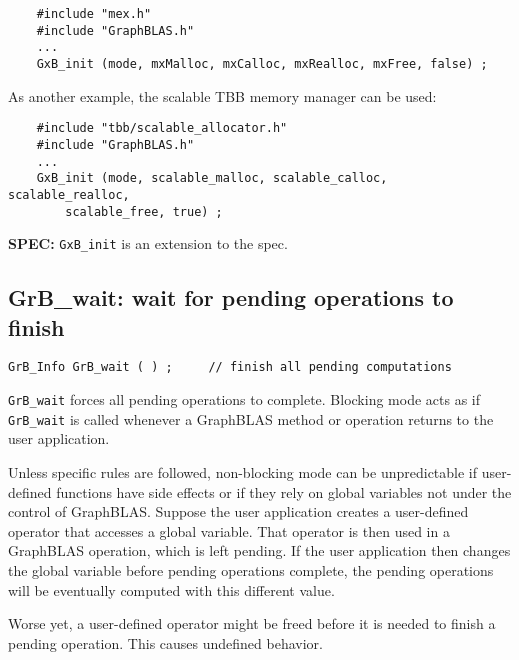 \documentclass[12pt]{article}
\begin{document}
    {\footnotesize
    \begin{verbatim}
    #include "mex.h"
    #include "GraphBLAS.h"
    ...
    GxB_init (mode, mxMalloc, mxCalloc, mxRealloc, mxFree, false) ; \end{verbatim}}

As another example, the scalable TBB memory manager can be used:

    {\footnotesize
    \begin{verbatim}
    #include "tbb/scalable_allocator.h"
    #include "GraphBLAS.h"
    ...
    GxB_init (mode, scalable_malloc, scalable_calloc, scalable_realloc,
        scalable_free, true) ; \end{verbatim}}

\begin{spec}
{\bf SPEC:} \verb'GxB_init' is an extension to the spec.
\end{spec}

\newpage
\subsection{{\sf GrB\_wait:} wait for pending operations to finish} %
\label{wait}

\begin{mdframed}[userdefinedwidth=6in]
{\footnotesize
\begin{verbatim}
GrB_Info GrB_wait ( ) ;     // finish all pending computations
\end{verbatim}
}\end{mdframed}

\verb'GrB_wait' forces all pending operations to complete.
Blocking mode acts as if \verb'GrB_wait' is called whenever a GraphBLAS
method or operation returns to the user application.

Unless specific rules are followed, non-blocking mode can be unpredictable if
user-defined functions have side effects or if they rely on global variables
not under the control of GraphBLAS.  Suppose the user application creates a
user-defined operator that accesses a global variable.  That operator is then
used in a GraphBLAS operation, which is left pending.  If the user application
then changes the global variable before pending operations complete, the
pending operations will be eventually computed with this different value.

Worse yet, a user-defined operator might be freed before it is needed to finish
a pending operation.  This causes undefined behavior.
\end{document}
